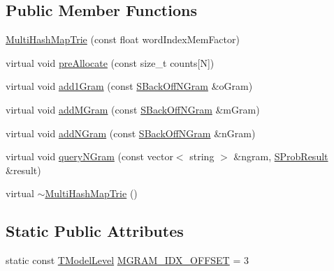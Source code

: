 \subsection*{Public Member Functions}
\begin{DoxyCompactItemize}
\item 
\hyperlink{classuva_1_1smt_1_1tries_1_1_multi_hash_map_trie_a33184c09e7b63bcdbfad0443492cab93}{Multi\+Hash\+Map\+Trie} (const float word\+Index\+Mem\+Factor)
\item 
virtual void \hyperlink{classuva_1_1smt_1_1tries_1_1_multi_hash_map_trie_ac7d916356f0ad36d33c0c4722e6459b9}{pre\+Allocate} (const size\+\_\+t counts\mbox{[}N\mbox{]})
\item 
virtual void \hyperlink{classuva_1_1smt_1_1tries_1_1_multi_hash_map_trie_aa49f2f0ed0d86038fe5efb13e6ee70a5}{add1\+Gram} (const \hyperlink{structuva_1_1smt_1_1tries_1_1_s_back_off_n_gram}{S\+Back\+Off\+N\+Gram} \&o\+Gram)
\item 
virtual void \hyperlink{classuva_1_1smt_1_1tries_1_1_multi_hash_map_trie_aa01609671de94014323015352e03c441}{add\+M\+Gram} (const \hyperlink{structuva_1_1smt_1_1tries_1_1_s_back_off_n_gram}{S\+Back\+Off\+N\+Gram} \&m\+Gram)
\item 
virtual void \hyperlink{classuva_1_1smt_1_1tries_1_1_multi_hash_map_trie_a3ecb4eb51f5163eedcf100ed8b8f0104}{add\+N\+Gram} (const \hyperlink{structuva_1_1smt_1_1tries_1_1_s_back_off_n_gram}{S\+Back\+Off\+N\+Gram} \&n\+Gram)
\item 
virtual void \hyperlink{classuva_1_1smt_1_1tries_1_1_multi_hash_map_trie_a6b31b10b19c93ea3e6d08923ee1c0df7}{query\+N\+Gram} (const vector$<$ string $>$ \&ngram, \hyperlink{structuva_1_1smt_1_1tries_1_1_s_prob_result}{S\+Prob\+Result} \&result)
\item 
virtual \hyperlink{classuva_1_1smt_1_1tries_1_1_multi_hash_map_trie_aa4b3b06c1768e6a5725e5ff5eda5a6e4}{$\sim$\+Multi\+Hash\+Map\+Trie} ()
\end{DoxyCompactItemize}
\subsection*{Static Public Attributes}
\begin{DoxyCompactItemize}
\item 
static const \hyperlink{namespaceuva_1_1smt_1_1tries_a26064146e98856c7c4185efab0e61a36}{T\+Model\+Level} \hyperlink{classuva_1_1smt_1_1tries_1_1_multi_hash_map_trie_a7efd4616e7d1f51db0cc4cb50f11345e}{M\+G\+R\+A\+M\+\_\+\+I\+D\+X\+\_\+\+O\+F\+F\+S\+E\+T} = 3
\end{DoxyCompactItemize}
